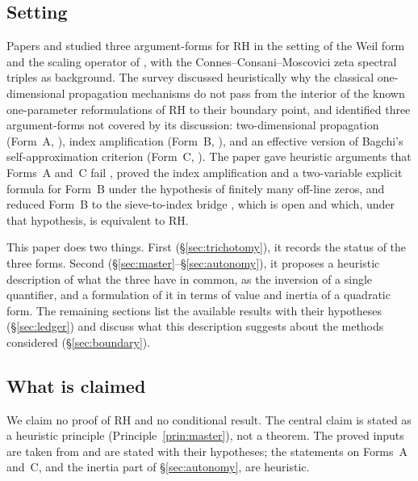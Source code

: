 \documentclass[11pt]{amsart}
\theoremstyle{definition}
\theoremstyle{remark}
\begin{document}
\subsection{Setting}
Papers \cite{P27} and \cite{P28} studied three argument-forms for RH in the
setting of the Weil form and the scaling operator of \cite{P25}, with the
Connes--Consani--Moscovici zeta spectral triples \cite{CCM25} as background.
The survey \cite{P27} discussed heuristically why the classical
one-dimensional propagation mechanisms do not pass from the interior of the
known one-parameter reformulations of RH to their boundary point, and
identified three argument-forms not covered by its discussion:
two-dimensional propagation (Form~A, \cite[Problem~6.1]{P27}), index
amplification (Form~B, \cite[Problem~7.1]{P27}), and an effective version of
Bagchi's self-approximation criterion (Form~C, \cite[Problem~8.1]{P27}).
The paper \cite{P28} gave heuristic arguments that Forms~A and~C fail
\cite[Heuristics~2.1, 2.2, 3.1]{P28}, proved the index amplification and a
two-variable explicit formula for Form~B under the hypothesis of finitely many
off-line zeros, and reduced Form~B to the sieve-to-index bridge
\cite[Missing Lemma~6.1]{P28}, which is open and which, under that hypothesis,
is equivalent to RH.

This paper does two things. First (\S\ref{sec:trichotomy}), it records the
status of the three forms. Second (\S\ref{sec:master}--\S\ref{sec:autonomy}),
it proposes a heuristic description of what the three have in common, as the
inversion of a single quantifier, and a formulation of it in terms of value
and inertia of a quadratic form. The remaining sections list the available
results with their hypotheses (\S\ref{sec:ledger}) and discuss what this
description suggests about the methods considered (\S\ref{sec:boundary}).

\subsection{What is claimed}
We claim no proof of RH and no conditional result. The central claim is
stated as a heuristic principle (Principle~\ref{prin:master}), not a theorem.
The proved inputs are taken from \cite{P24,P25,P27,P28} and are stated with
their hypotheses; the statements on Forms~A and~C, and the inertia part of
\S\ref{sec:autonomy}, are heuristic.
\end{document}
